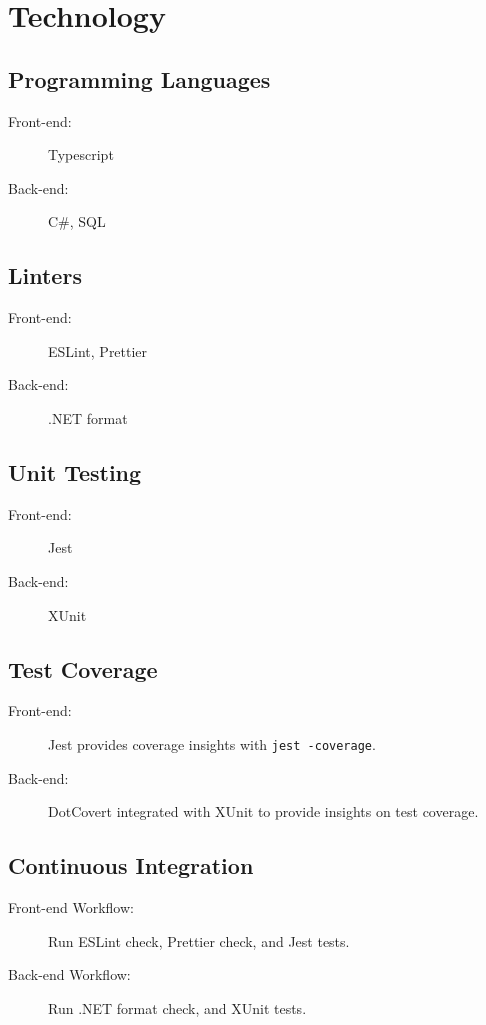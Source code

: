 \documentclass{article}
\begin{document}
	\section{Technology}

	\subsection{Programming Languages}
	\begin{description}
		\item[Front-end:] Typescript
		\item[Back-end:] C\#, SQL
	\end{description}

	\subsection{Linters}
	\begin{description}
		\item[Front-end:] ESLint, Prettier
		\item[Back-end:] .NET format
	\end{description}

	\subsection{Unit Testing}
	\begin{description}
		\item[Front-end:] Jest
		\item[Back-end:] XUnit
	\end{description}

	\subsection{Test Coverage}
	\begin{description}
		\item[Front-end:] Jest provides coverage insights with \texttt{jest -coverage}.
		\item[Back-end:] DotCovert integrated with XUnit to provide insights on test coverage.
	\end{description}

	\subsection{Continuous Integration}
	\begin{description}
		\item[Front-end Workflow:] Run ESLint check, Prettier check, and Jest tests.
		\item[Back-end Workflow:] Run .NET format check, and XUnit tests.
	\end{description}
\end{document}
